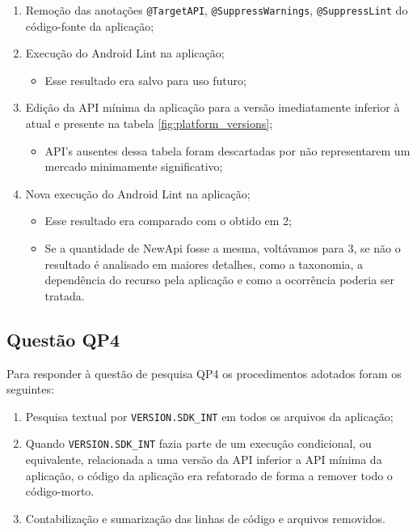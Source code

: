 \begin{enumerate}
	\item Remoção das anotações \texttt{@TargetAPI}, \texttt{@SuppressWarnings},
		 	\texttt{@SuppressLint} do código-fonte da aplicação;
	\item Execução do Android Lint na aplicação;
		\begin{itemize}
			\item Esse resultado era salvo para uso futuro;
		\end{itemize}
	\item Edição da API mínima da aplicação para a versão imediatamente inferior à atual
		e presente na tabela \ref{fig:platform_versions};
		\begin{itemize}
			\item API's ausentes dessa tabela foram descartadas por não representarem
			um mercado minimamente significativo;
		\end{itemize}
	\item Nova execução do Android Lint na aplicação;
		\begin{itemize}
			\item Esse resultado era comparado com o obtido em 2;
			\item Se a quantidade de NewApi fosse a mesma, voltávamos para 3, se não
			o resultado é analisado em maiores detalhes, como a taxonomia, a dependência
			do recurso pela aplicação e como a ocorrência poderia ser tratada.
		\end{itemize}
\end{enumerate}

\subsection{Questão QP4}
Para responder à questão de pesquisa QP4 os procedimentos adotados foram os seguintes:

\begin{enumerate}
	\item Pesquisa textual por \texttt{VERSION.SDK\_INT} em todos os arquivos da
		aplicação;
	\item Quando \texttt{VERSION.SDK\_INT} fazia parte de um execução condicional, ou equivalente, relacionada a uma versão da API inferior a API mínima da aplicação, o código da aplicação era refatorado de forma a remover todo o código-morto.
	\item Contabilização e sumarização das linhas de código e arquivos removidos.
\end{enumerate}

